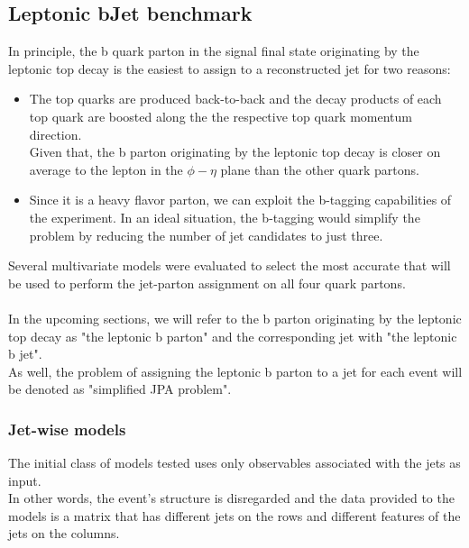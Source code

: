 \subsection{Leptonic bJet benchmark}
In principle, the b quark parton in the signal final state originating by the leptonic top decay is the easiest to assign to a reconstructed jet for two reasons:
\begin{itemize}
    \item The top quarks are produced back-to-back and the decay products of each top quark are boosted along the the respective top quark momentum direction.\\
    Given that, the b parton originating by the leptonic top decay is closer on average to the lepton in the $\phi-\eta$ plane than the other quark partons.
    \item Since it is a heavy flavor parton, we can exploit the b-tagging capabilities of the experiment. In an ideal situation, the b-tagging would simplify the problem by reducing the number of jet candidates to just three.
\end{itemize}
Several multivariate models were evaluated to select the most accurate that will be used to perform the jet-parton assignment on all four quark partons.\\
\\
In the upcoming sections, we will refer to the b parton originating by the leptonic top decay as "the leptonic b parton" and the corresponding jet with "the leptonic b jet".\\
As well, the problem of assigning the leptonic b parton to a jet for each event will be denoted as "simplified JPA problem".
\subsubsection*{Jet-wise models}
The initial class of models tested uses only observables associated with the jets as input.\\
In other words, the event's structure is disregarded and the data provided to the models is a matrix that has different jets on the rows and different features of the jets on the columns.  

